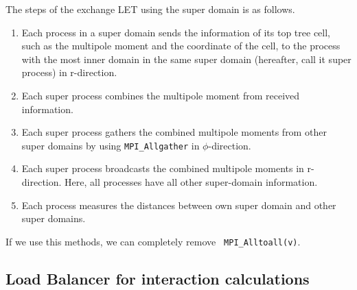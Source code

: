 \documentclass[]{pasj01}
\begin{document}
The steps of the exchange LET using the super domain is as follows.

\begin{enumerate}

\item Each process in a super domain sends the information of its top
  tree cell, such as the multipole moment and the coordinate of the
  cell, to the process with the most inner domain in the same super
  domain (hereafter, call it super process) in r-direction.
   
\item Each super process combines the multipole moment from received
  information.

\item Each super process gathers the combined multipole moments from
  other super domains by using {\tt MPI\_Allgather} in
  $\phi$-direction.

\item Each super process broadcasts the combined multipole moments in
  r-direction. Here, all processes have all other super-domain
  information.

\item Each process measures the distances between own super domain and
  other super domains.

    
\end{enumerate}

If we use this methods, we can completely remove {\tt
  MPI\_Alltoall(v)}.


\subsection{Load Balancer for interaction calculations}
\label{subsec:force}
\end{document}
